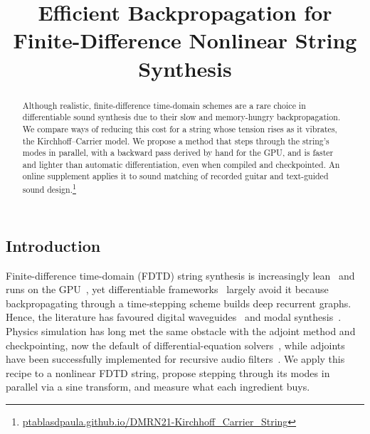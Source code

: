 \documentclass[a4paper]{article}
\title{Efficient Backpropagation for\\Finite-Difference Nonlinear String Synthesis}
\begin{document}
\ninept
\maketitle
\begin{sloppy}
\begin{abstract}
Although realistic, finite-difference time-domain schemes are a rare choice
in differentiable sound synthesis due to their slow and memory-hungry
backpropagation. We compare ways of reducing this cost for a string whose
tension rises as it vibrates, the Kirchhoff--Carrier model. We propose a
method that steps through the string's modes in parallel, with a backward
pass derived by hand for the GPU, and is faster and lighter than
automatic differentiation, even when compiled and checkpointed. An online
supplement applies it to sound matching of recorded guitar and
text-guided sound design.\footnote{\fontsize{6}{7}\selectfont\url{ptablasdpaula.github.io/DMRN21-Kirchhoff_Carrier_String}}
\end{abstract}

\section{Introduction}
Finite-difference time-domain (FDTD) string synthesis is increasingly lean~\cite{bilbao2024guitar} and runs on the GPU~\cite{lee2024string}, yet differentiable
frameworks~\cite{hayes2024review} largely avoid it because
backpropagating through a time-stepping scheme builds deep recurrent graphs. Hence, the literature has favoured
digital waveguides~\cite{tablas2026sound} and modal
synthesis~\cite{diaz2025}. Physics simulation has long met the same obstacle
with the adjoint method and checkpointing, now the default of
differential-equation solvers~\cite{kidger2021}, while adjoints have been
successfully implemented for recursive audio filters~\cite{yu2024allpole}.
We apply this recipe to a nonlinear FDTD string, propose stepping through
its modes in parallel via a sine transform, and measure what each
ingredient buys.


\end{sloppy}
\end{document}
